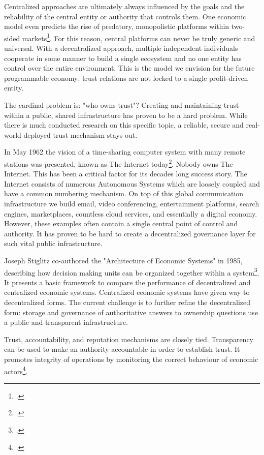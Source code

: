 \documentclass[USenglish]{article}
\begin{document}
Centralized approaches are ultimately always influenced by the goals and the reliability of the central entity or authority that controls them. 
One economic model even predicts the rise of predatory, monopolistic platforms within two-sided markets\footcite{loertscher2016predatory}.
For this reason, central platforms can never be truly generic and universal. 
With a decentralized approach, multiple independent individuals cooperate in some manner to build a single ecosystem and no one entity has control over the entire environment.
This is the model we envision for the future programmable economy: trust relations are not locked to a single profit-driven entity.

The cardinal problem is: "who owns trust"?
Creating and maintaining trust within a public, shared infrastructure has proven to be a hard problem.
While there is much conducted research on this specific topic, a reliable, secure and real-world deployed trust mechanism stays out.

In May 1962 the vision of a time-sharing computer system with many remote stations was presented, known as The Internet today\footcite{licklider1962line}.
Nobody owns The Internet.
This has been a critical factor for its decades long success story.
The Internet consists of numerous Autonomous Systems which are loosely coupled and have a common numbering mechanism.
On top of this global communication infrastructure we build email, video conferencing, entertainment platforms, search engines, marketplaces, countless cloud services, and essentially a digital economy.
However, these examples often contain a single central point of control and authority.
It has proven to be hard to create a decentralized governance layer for such vital public infrastructure.

Joseph Stiglitz co-authored the "Architecture of Economic Systems" in 1985, describing how decision making units can be organized together within a system\footcite{sah1985architecture}.
It presents a basic framework to compare the performance of decentralized and centralized economic systems.
Centralized economic systems have given way to decentralized forms.
The current challenge is to further refine the decentralized form: storage and governance of authoritative answers to ownership questions use a public and transparent infrastructure.

Trust, accountability, and reputation mechanisms are closely tied.
Transparency can be used to make an authority accountable in order to establish trust. 
It promotes integrity of operations by monitoring the correct behaviour of economic actors\footcite{troncoso2017systematizing}.
\end{document}
